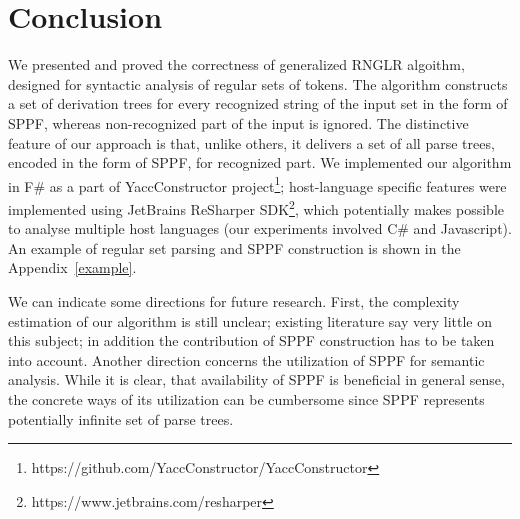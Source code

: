 \section{Conclusion}
%

We presented and proved the correctness of generalized RNGLR algoithm, designed for syntactic analysis of regular sets of
tokens. The algorithm constructs a set of derivation trees for every recognized string of the input set in the form of SPPF, 
whereas non-recognized part of the input is ignored. The distinctive feature of our approach is that, unlike others, it 
delivers a set of all parse trees, encoded in the form of SPPF, for recognized part. We implemented our algorithm in F\# as a part of YaccConstructor 
project\footnote{https://github.com/YaccConstructor/YaccConstructor}; host-language specific features were implemented
using JetBrains ReSharper SDK\footnote{https://www.jetbrains.com/resharper}, which potentially makes possible to
analyse multiple host languages (our experiments involved C\# and Javascript). An example of regular set parsing and
SPPF construction is shown in the Appendix~\ref{example}.

We can indicate some directions for future research. First, the complexity estimation of our algorithm is still unclear; existing
literature say very little on this subject; in addition the contribution of SPPF construction has to be taken into account. 
Another direction concerns the utilization of SPPF for semantic analysis. While it is clear, that availability of SPPF 
is beneficial in general sense, the concrete ways of its utilization can be cumbersome since SPPF represents 
potentially infinite set of parse trees. 

